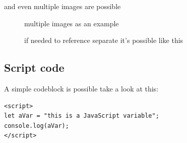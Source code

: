 \documentclass[10pt,a4paper]{article}
\begin{document}
and even multiple images are possible

\begin{figure}[H]
	\centering
	\caption{multiple images as an example}
	\caption{if needed to reference separate it's possible like this}
\end{figure}

\subsection{Script code}
A simple codeblock is possible take a look at this:
\begin{lstlisting}
<script>
let aVar = "this is a JavaScript variable";
console.log(aVar);
</script>
\end{lstlisting}
\end{document}
